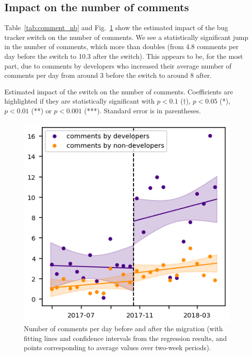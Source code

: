 \documentclass[conference]{IEEEtran}
\begin{document}
\subsection{Impact on the number of comments}

Table~\ref{tab:comment_nb} and Fig.~\ref{comment_nb_rd} show the estimated impact of the bug tracker switch on the number of comments. We see a statistically significant jump in the number of comments, which more than doubles (from 4.8 comments per day before the switch to 10.3 after the switch). This appears to be, for the most part, due to comments by developers who increased their average number of comments per day from around 3 before the switch to around 8 after.

\begin{table}
\centering
\caption{Estimated impact of the switch on the number of comments. Coefficients are highlighted if they are statistically significant with $p<0.1$ ($\dagger$), $p<0.05$ (*), $p<0.01$ (**) or $p<0.001$ (***). Standard error is in parentheses.}
\label{tab:comment_nb}

\end{table}

\begin{figure}
\includegraphics{comment_nb_rd.png}
\caption{Number of comments per day before and after the migration (with fitting lines and confidence intervals from the regression results, and points corresponding to average values over two-week periods).} \label{comment_nb_rd}
\end{figure}
\end{document}
